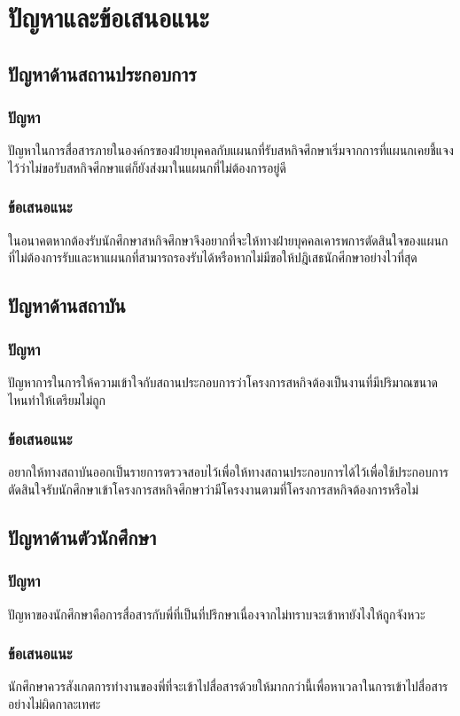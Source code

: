 \chapter{ปัญหาและข้อเสนอแนะ}
\thispagestyle{empty}
\label{chapter:result}

\section{ปัญหาด้านสถานประกอบการ}
    \subsection{ปัญหา}
        ปัญหาในการสื่อสารภายในองค์กรของฝ่ายบุคคลกับแผนกที่รับสหกิจศึกษาเริ่มจากการที่แผนกเคยชี้แจงไว้ว่าไม่ขอรับสหกิจศีกษาแต่ก็ยังส่งมาในแผนกที่ไม่ต้องการอยู่ดี
    \subsection{ข้อเสนอแนะ}
        ในอนาคตหากต้องรับนักศึกษาสหกิจศึกษาจึงอยากที่จะให้ทางฝ่ายบุคคลเคารพการตัดสินใจของแผนกที่ไม่ต้องการรับและหาแผนกที่สามารถรองรับได้หรือหากไม่มีขอให้ปฎิเสธนักศีกษาอย่างไวที่สุด

\section{ปัญหาด้านสถาบัน}
    \subsection{ปัญหา}
        ปัญหาการในการให้ความเข้าใจกับสถานประกอบการว่าโครงการสหกิจต้องเป็นงานที่มีปริมาณขนาดไหนทำให้เตรียมไม่ถูก
    \subsection{ข้อเสนอแนะ}
        อยากให้ทางสถาบันออกเป็นรายการตรวจสอบไว้เพื่อให้ทางสถานประกอบการได้ไว้เพื่อใช้ประกอบการตัดสินใจรับนักศึกษาเข้าโครงการสหกิจศีกษาว่ามีโครงงานตามที่โครงการสหกิจต้องการหรือไม่
\section{ปัญหาด้านตัวนักศึกษา}
    \subsection{ปัญหา}
        ปัญหาของนักศึกษาคือการสื่อสารกับพี่ที่เป็นที่ปรึกษาเนื่องจากไม่ทราบจะเข้าหายังไงให้ถูกจังหวะ
    \subsection{ข้อเสนอแนะ}
        นักศึกษาควรสังเกตการทำงานของพี่ที่จะเข้าไปสื่อสารด้วยให้มากกว่านี้เพื่อหาเวลาในการเข้าไปสื่อสารอย่างไม่ผิดกาละเทศะ

